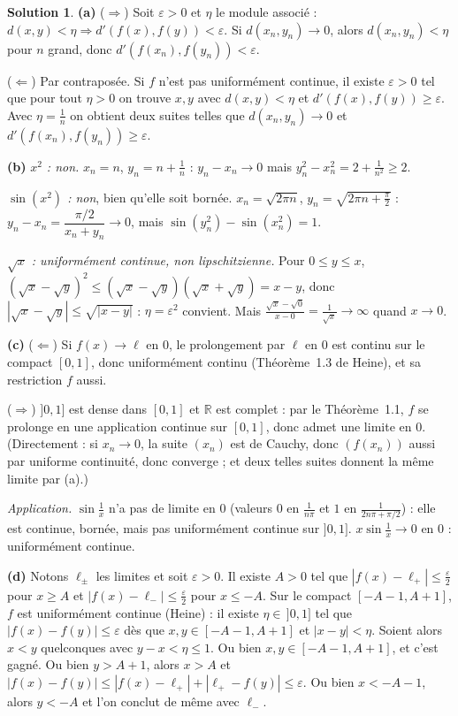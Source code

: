 \documentclass[11pt,a4paper]{article}
\newcommand{\R}{\mathbb{R}}
\theoremstyle{definition}
\newtheorem*{solution}{Solution}
\begin{document}
\begin{solution}
\noindent\textbf{(a)} ($\Rightarrow$) Soit $\varepsilon>0$ et $\eta$ le module associé : $d(x,y)<\eta\Rightarrow d'(f(x),f(y))<\varepsilon$. Si $d(x_n,y_n)\to0$, alors $d(x_n,y_n)<\eta$ pour $n$ grand, donc $d'(f(x_n),f(y_n))<\varepsilon$.

($\Leftarrow$) Par contraposée. Si $f$ n'est pas uniformément continue, il existe $\varepsilon>0$ tel que pour tout $\eta>0$ on trouve $x,y$ avec $d(x,y)<\eta$ et $d'(f(x),f(y))\ge\varepsilon$. Avec $\eta=\frac1n$ on obtient deux suites telles que $d(x_n,y_n)\to0$ et $d'(f(x_n),f(y_n))\ge\varepsilon$.

\medskip
\noindent\textbf{(b)} \emph{$x^2$ : non.} $x_n=n$, $y_n=n+\frac1n$ : $y_n-x_n\to0$ mais $y_n^2-x_n^2=2+\frac1{n^2}\ge2$.

\emph{$\sin(x^2)$ : non}, bien qu'elle soit bornée. $x_n=\sqrt{2\pi n}$, $y_n=\sqrt{2\pi n+\frac\pi2}$ : $y_n-x_n=\dfrac{\pi/2}{x_n+y_n}\to0$, mais $\sin(y_n^2)-\sin(x_n^2)=1$.

\emph{$\sqrt x$ : uniformément continue, non lipschitzienne.} Pour $0\le y\le x$, $(\sqrt x-\sqrt y)^2\le(\sqrt x-\sqrt y)(\sqrt x+\sqrt y)=x-y$, donc $|\sqrt x-\sqrt y|\le\sqrt{|x-y|}$ : $\eta=\varepsilon^2$ convient. Mais $\frac{\sqrt x-\sqrt0}{x-0}=\frac1{\sqrt x}\to\infty$ quand $x\to0$.

\medskip
\noindent\textbf{(c)} ($\Leftarrow$) Si $f(x)\to\ell$ en $0$, le prolongement par $\ell$ en $0$ est continu sur le compact $[0,1]$, donc uniformément continu (Théorème~1.3 de Heine), et sa restriction $f$ aussi.

($\Rightarrow$) $]0,1]$ est dense dans $[0,1]$ et $\R$ est complet : par le Théorème~1.1, $f$ se prolonge en une application continue sur $[0,1]$, donc admet une limite en $0$. (Directement : si $x_n\to0$, la suite $(x_n)$ est de Cauchy, donc $(f(x_n))$ aussi par uniforme continuité, donc converge ; et deux telles suites donnent la même limite par (a).)

\emph{Application.} $\sin\frac1x$ n'a pas de limite en $0$ (valeurs $0$ en $\frac1{n\pi}$ et $1$ en $\frac1{2n\pi+\pi/2}$) : elle est continue, bornée, mais pas uniformément continue sur $]0,1]$. $x\sin\frac1x\to0$ en $0$ : uniformément continue.

\medskip
\noindent\textbf{(d)} Notons $\ell_\pm$ les limites et soit $\varepsilon>0$. Il existe $A>0$ tel que $|f(x)-\ell_+|\le\frac\varepsilon2$ pour $x\ge A$ et $|f(x)-\ell_-|\le\frac\varepsilon2$ pour $x\le-A$. Sur le compact $[-A-1,A+1]$, $f$ est uniformément continue (Heine) : il existe $\eta\in\,]0,1]$ tel que $|f(x)-f(y)|\le\varepsilon$ dès que $x,y\in[-A-1,A+1]$ et $|x-y|<\eta$. Soient alors $x<y$ quelconques avec $y-x<\eta\le1$. Ou bien $x,y\in[-A-1,A+1]$, et c'est gagné. Ou bien $y>A+1$, alors $x>A$ et $|f(x)-f(y)|\le|f(x)-\ell_+|+|\ell_+-f(y)|\le\varepsilon$. Ou bien $x<-A-1$, alors $y<-A$ et l'on conclut de même avec $\ell_-$.
\end{solution}
\end{document}
